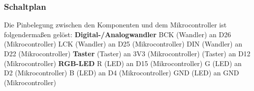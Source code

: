 \documentclass[]{article}
\begin{document}
\subsubsection{Schaltplan}
Die Pinbelegung zwischen den Komponenten und dem Mikrocontroller ist folgendermaßen gelöst:
\vspace{4mm}\newline
\textbf{Digital-/Analogwandler} \newline
BCK (Wandler) an D26 (Mikrocontroller)\newline
LCK (Wandler) an D25 (Mikrocontroller)\newline
DIN (Wandler) an D22 (Mikrocontroller)\newline
\vspace{4mm}\newline
\textbf{Taster}  (Taster) an 3V3 (Mikrocontroller) (Taster) an D12 (Mikrocontroller)\newline
\vspace{4mm}\newline
\textbf{RGB-LED} \newline
R (LED) an D15 (Mikrocontroller)\newline
G (LED) an D2 (Mikrocontroller)\newline
B (LED) an D4 (Mikrocontroller)\newline
GND (LED) an GND (Mikrocontroller)\newline
\end{document}
